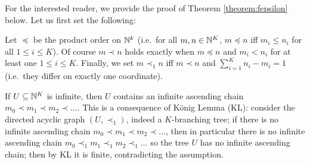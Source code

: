 For the interested reader, we provide the proof of Theorem \ref{theorem:fepsilon} below. Let us first set the following:
\begin{definition}
 Let $\preceq$ be the product order on $\mathbb{N}^k$ (i.e.\ for all $ m  , n  \in \mathbb{N}^{K}$, $ m  \preceq  n  $ iff $m_{i}\leq n_{i}$ for all $1\leq i\leq K$).
 Of course $ m  \prec  n  $ holds exactly when $ m  \preceq  n  $ and $m_{i}<n_{i}$ for at least one $1\leq i\leq K$.
 Finally, we set $ m  \prec_{1} n  $  iff
$ m  \prec  n  $ and $\sum_{i=1}^{K}n_{i}-m_{i}=1$ (i.e.\ they differ on exactly one coordinate).
\end{definition}


\begin{remark}\label{rmk:AC2}
If $U\subseteq \mathbb{N}^{K}$ is infinite, then $U$ contains an infinite ascending chain $ m  _{0}\prec  m  _{1} \prec  m  _{2} \prec \dots$.
This is a consequence of K\"onig Lemma (KL): consider the directed acyclic graph $(U,\prec_{1})$, indeed a $K$-branching tree; if there is no infinite ascending chain $  m  _{0}\prec  m  _{1} \prec  m  _{2} \prec \dots$, then in particular there is no infinite ascending chain $  m  _{0}\prec_{1}  m  _{1} \prec_{1}  m  _{2} \prec_{1} \dots$ so the tree $U$ has no infinite ascending chain; then by KL it is finite, contradicting the assumption. 
\end{remark}


